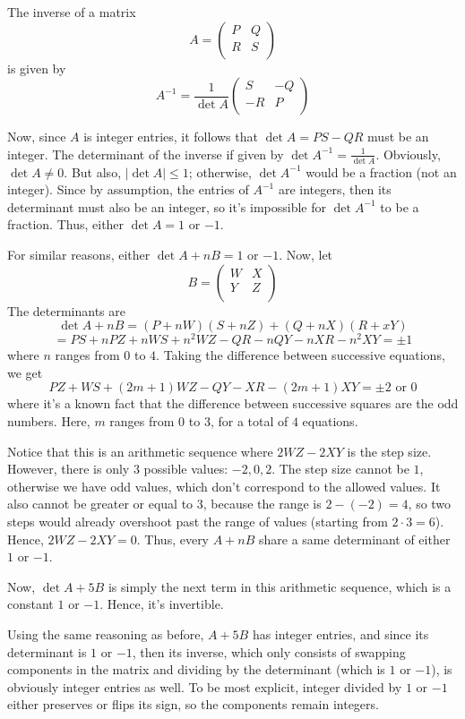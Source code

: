 \documentclass{book}
\begin{document}
The inverse of a matrix
$$A = \begin{pmatrix}
  P & Q \\
  R & S \\
\end{pmatrix}
$$
is given by 
$$A^{-1} = \frac{1}{\det A} \begin{pmatrix}
  S & -Q \\
  -R & P \\
\end{pmatrix}
$$

Now, since $A$ is integer entries, it follows that $\det A = PS - QR$ must be an integer. The determinant of the inverse if given by $\det A^{-1} = \frac{1}{\det A}$. Obviously, $\det A \neq 0$. But also, $|\det A| \leq 1$; otherwise, $\det A^{-1}$ would be a fraction (not an integer). Since by assumption, the entries of $A^{-1}$ are integers, then its determinant must also be an integer, so it's impossible for $\det A^{-1}$ to be a fraction. Thus, either $\det A = 1$ or $-1$.

For similar reasons, either $\det A + nB = 1$ or $-1$. Now, let
$$B = \begin{pmatrix}
  W & X \\
  Y & Z \\
\end{pmatrix}
$$
The determinants are
$$\det A + nB = (P + nW)(S + nZ) + (Q + nX)(R + xY)$$
$$= PS + nPZ + nWS + n^2 WZ - QR - nQY - nXR - n^2 XY = \pm 1$$
where $n$ ranges from $0$ to $4$. Taking the difference between successive equations, we get
$$PZ + WS + (2m + 1)WZ - QY - XR - (2m + 1)XY = \pm 2 \text{ or } 0$$
where it's a known fact that the difference between successive squares are the odd numbers. Here, $m$ ranges from $0$ to $3$, for a total of $4$ equations.

Notice that this is an arithmetic sequence where $2WZ - 2XY$ is the step size. However, there is only $3$ possible values: $-2, 0, 2$. The step size cannot be $1$, otherwise we have odd values, which don't correspond to the allowed values. It also cannot be greater or equal to $3$, because the range is $2 - (-2) = 4$, so two steps would already overshoot past the range of values (starting from $2 \cdot 3 = 6$). Hence, $2WZ - 2XY = 0$. Thus, every $A + nB$ share a same determinant of either $1$ or $-1$.

Now, $\det A + 5B$ is simply the next term in this arithmetic sequence, which is a constant $1$ or $-1$. Hence, it's invertible.

Using the same reasoning as before, $A + 5B$ has integer entries, and since its determinant is $1$ or $-1$, then its inverse, which only consists of swapping components in the matrix and dividing by the determinant (which is $1$ or $-1$), is obviously integer entries as well. To be most explicit, integer divided by $1$ or $-1$ either preserves or flips its sign, so the components remain integers.
\end{document}
